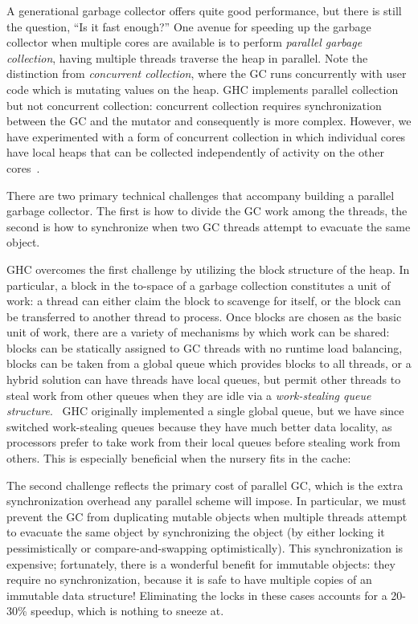 A generational garbage collector offers quite good performance, but
there is still the question, ``Is it fast enough?''  One avenue for
speeding up the garbage collector when multiple cores are available is
to perform \emph{parallel garbage collection}, having multiple threads
traverse the heap in parallel.  Note the distinction from
\emph{concurrent collection}, where the GC runs concurrently with user
code which is mutating values on the heap.  GHC implements parallel
collection~\cite{Marlow:2008:PGG:1375634.1375637} but not concurrent
collection: concurrent collection requires synchronization between the
GC and the mutator and consequently is more complex.  However, we have
experimented with a form of concurrent collection in which individual
cores have local heaps that can be collected independently of activity
on the other cores~\cite{local-heaps}.

There are two primary technical challenges that accompany building a
parallel garbage collector.  The first is how to divide the GC work
among the threads, the second is how to synchronize when two GC threads
attempt to evacuate the same object.

GHC overcomes the first challenge by utilizing the block structure of
the heap.  In particular, a block in the to-space of a garbage
collection constitutes a unit of work: a thread can either claim the
block to scavenge for itself, or the block can be transferred to another
thread to process.  Once blocks are chosen as the basic unit of
work, there are a variety of mechanisms by which work can be shared:
blocks can be statically assigned to GC threads with no runtime load
balancing, blocks can be taken from a global queue which provides blocks
to all threads, or a hybrid solution can have threads have local queues,
but permit other threads to steal work from other queues when they are
idle via a \emph{work-stealing queue structure}.~\cite{Arora:1998:TSM:277651.277678}  GHC originally
implemented a single global queue, but we have since switched work-stealing queues
because they have much better data locality, as processors prefer to take
work from their local queues before stealing work from others.  This is
especially beneficial when the nursery fits in the cache: 

The second challenge reflects the primary cost of parallel GC, which is
the extra synchronization overhead any parallel scheme will impose.  In
particular, we must prevent the GC from duplicating mutable objects when
multiple threads attempt to evacuate the same object by synchronizing
the object (by either locking it pessimistically or compare-and-swapping
optimistically).  This synchronization is expensive; fortunately, there
is a wonderful benefit for immutable objects: they require no
synchronization, because it is safe to have multiple copies of an
immutable data structure!  Eliminating the locks in these cases accounts
for a 20-30\% speedup, which is nothing to sneeze at.

